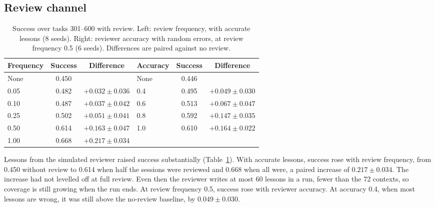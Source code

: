 \documentclass{article}
\begin{document}
\subsection{Review channel}
\label{sec:review}

\begin{table}[t]
\centering
\caption{Success over tasks 301--600 with review. Left: review frequency, with accurate
lessons (8 seeds). Right: reviewer accuracy with random errors, at review frequency 0.5
(6 seeds). Differences are paired against no review.}
\label{tab:review}
\small
\begin{tabular}{lcc@{\hskip 2em}lcc}
\toprule
Frequency & Success & Difference & Accuracy & Success & Difference \\
\midrule
None & 0.450 &                   & None & 0.446 & \\
0.05 & 0.482 & $+0.032 \pm 0.036$ & 0.4 & 0.495 & $+0.049 \pm 0.030$ \\
0.10 & 0.487 & $+0.037 \pm 0.042$ & 0.6 & 0.513 & $+0.067 \pm 0.047$ \\
0.25 & 0.502 & $+0.051 \pm 0.041$ & 0.8 & 0.592 & $+0.147 \pm 0.035$ \\
0.50 & 0.614 & $+0.163 \pm 0.047$ & 1.0 & 0.610 & $+0.164 \pm 0.022$ \\
1.00 & 0.668 & $+0.217 \pm 0.034$ &     &       & \\
\bottomrule
\end{tabular}
\end{table}

Lessons from the simulated reviewer raised success substantially
(Table~\ref{tab:review}). With accurate lessons, success rose with review frequency, from
0.450 without review to 0.614 when half the sessions were reviewed and 0.668 when all
were, a paired increase of $0.217 \pm 0.034$. The increase had not levelled off at full
review. Even then the reviewer writes at most 60 lessons in a run, fewer than the 72
contexts, so coverage is still growing when the run ends. At review frequency 0.5,
success rose with reviewer accuracy. At accuracy 0.4, when most lessons are wrong, it was
still above the no-review baseline, by $0.049 \pm 0.030$.
\end{document}
